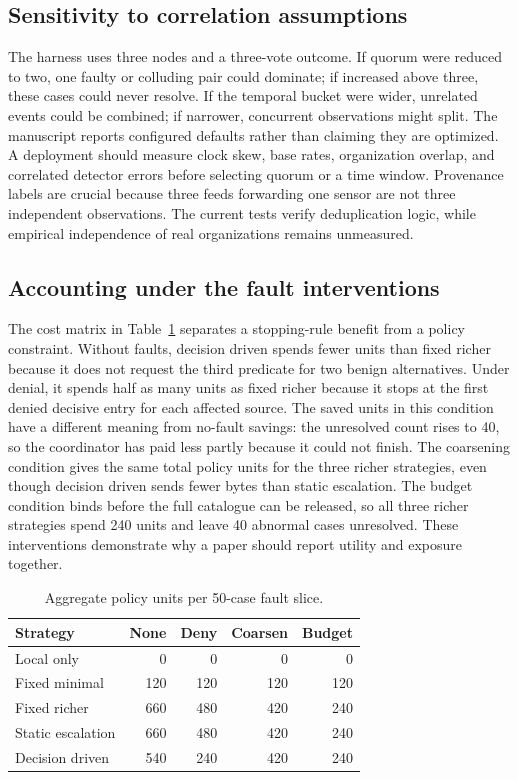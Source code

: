 \documentclass[conference,letterpaper]{IEEEtran}
\begin{document}
\subsection{Sensitivity to correlation assumptions}
The harness uses three nodes and a three-vote outcome. If quorum were reduced to two, one faulty or colluding pair could dominate; if increased above three, these cases could never resolve. If the temporal bucket were wider, unrelated events could be combined; if narrower, concurrent observations might split. The manuscript reports configured defaults rather than claiming they are optimized. A deployment should measure clock skew, base rates, organization overlap, and correlated detector errors before selecting quorum or a time window. Provenance labels are crucial because three feeds forwarding one sensor are not three independent observations. The current tests verify deduplication logic, while empirical independence of real organizations remains unmeasured.

\subsection{Accounting under the fault interventions}
The cost matrix in Table~\ref{tab:units} separates a stopping-rule benefit from a policy constraint. Without faults, decision driven spends fewer units than fixed richer because it does not request the third predicate for two benign alternatives. Under denial, it spends half as many units as fixed richer because it stops at the first denied decisive entry for each affected source. The saved units in this condition have a different meaning from no-fault savings: the unresolved count rises to 40, so the coordinator has paid less partly because it could not finish. The coarsening condition gives the same total policy units for the three richer strategies, even though decision driven sends fewer bytes than static escalation. The budget condition binds before the full catalogue can be released, so all three richer strategies spend 240 units and leave 40 abnormal cases unresolved. These interventions demonstrate why a paper should report utility and exposure together.

\begin{table}[t]
\centering\caption{Aggregate policy units per 50-case fault slice.}
\label{tab:units}\scriptsize
\begin{tabular}{lrrrr}\hline
Strategy & None & Deny & Coarsen & Budget \\\hline
Local only &0&0&0&0\\
Fixed minimal &120&120&120&120\\
Fixed richer &660&480&420&240\\
Static escalation &660&480&420&240\\
Decision driven &540&240&420&240\\\hline
\end{tabular}
\end{table}
\end{document}
